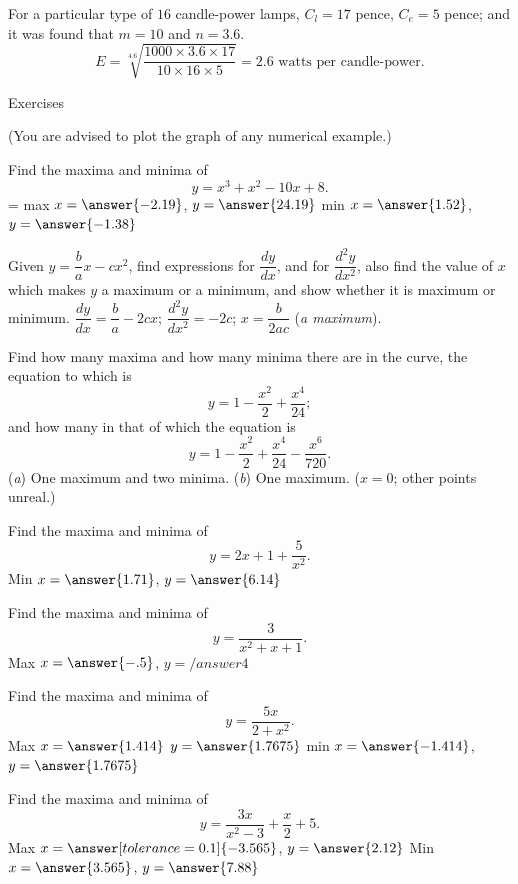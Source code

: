 \documentclass{ximera}
\begin{document}
For a particular type of $16$ candle-power lamps,
$C_l= 17$ pence, $C_e=5$ pence; and it was found that
$m=10$ and $n=3.6$.
\[
E = \sqrt[4.6]{\frac{1000 \times 3.6 \times 17}{10 \times 16 \times 5}}
  = 2.6\text{ watts per candle-power}.
\]


{\Large Exercises\par}(You are advised to plot the graph
of any numerical example.)

\begin{problem}
Find the maxima and minima of
\[
y = x^3 + x^2 - 10x + 8.
\]
= max $x =\answer{-2.19}$, $y = \answer{24.19}$ min $x =\answer{1.52}$, $y =\answer{-1.38}$ 
\end{problem}

\begin{problem}
Given $y = \dfrac{b}{a}x - cx^2$, find expressions for $\dfrac{dy}{dx}$, and
for $\dfrac{d^2y}{dx^2}$, also find the value of $x$ which makes $y$ a
maximum or a minimum, and show whether it is
maximum or minimum. $\dfrac{dy}{dx} = \dfrac{b}{a} - 2cx$; $\dfrac{d^2 y}{dx^2} = -2c$; $x = \dfrac{b}{2ac}$ (\textit{a maximum}).
\end{problem}

\begin{problem}
Find how many maxima and how many minima
there are in the curve, the equation to which is
\[
y = 1 - \frac{x^2}{2} + \frac{x^4}{24};
\]
and how many in that of which the equation is
\[
y = 1 - \frac{x^2}{2} + \frac{x^4}{24} - \frac{x^6}{720}.
\]
(\textit{a}) One maximum and two minima.
(\textit{b}) One maximum. ($x = 0$; other points unreal.)
\end{problem}

\begin{problem}
Find the maxima and minima of
\[
y=2x+1+\frac{5}{x^2}.
\]
Min $x=\answer{1.71}$, $y =\answer{6.14}$
\end{problem}

\begin{problem}
Find the maxima and minima of
\[
y=\frac{3}{x^2+x+1}.
\]
Max $x =\answer{-.5}$, $y =/answer{4}$
\end{problem}

\begin{problem}
Find the maxima and minima of
\[
y=\frac{5x}{2+x^2}.
\]
Max $x = \answer{1.414}$ $y =\answer{1.7675}$ min $x = \answer{-1.414}$, $y = \answer{1.7675}$
\end{problem}

\begin{problem}
Find the maxima and minima of
\[
y=\frac{3x}{x^2-3} + \frac{x}{2} + 5.
\]
Max $x =\answer[tolerance=0.1]{-3.565}$, $y =\answer{2.12}$
Min $x = \answer{3.565}$, $y =\answer{7.88}$
\end{problem}
\end{document}
